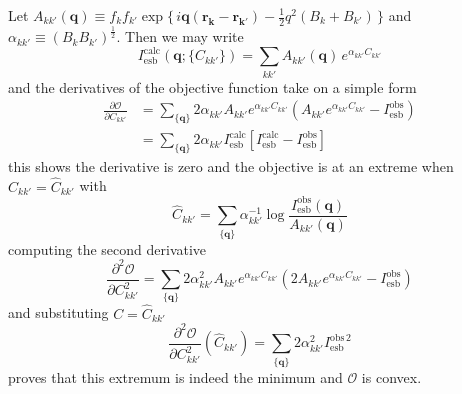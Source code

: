 \documentclass{article}
\begin{document}
Let $A_{k k'} (\mathbf{q}) \equiv f_{k}f_{k'} \exp \{ \, i \mathbf{q} (\mathbf{r_{k}}- \mathbf{r_{k'}}) - \frac{1}{2} q^2(B_k + B_{k'} ) \, \}$ and $\alpha_{k k'} \equiv (B_k B_{k'})^\frac{1}{2}$. Then we may write
\[
I_\mathrm{esb}^\mathrm{calc} (\mathbf{q}; \{ C_{kk'} \}) = \sum_{k k'} A_{k k'} (\mathbf{q}) \, e^{\alpha_{k k'} C_{k k'}}
\]
and the derivatives of the objective function take on a simple form
\begin{align*}
\frac{\partial \mathcal{O}} {\partial C_{kk'}} &= \sum_{\{\mathbf{q}\}}
2 \alpha_{k k'} A_{k k'} e^{\alpha_{k k'} C_{k k'}} 
\left( A_{k k'} e^{\alpha_{k k'} C_{k k'}} - I_\mathrm{esb}^\mathrm{obs}  \right) \\
%
&= \sum_{\{\mathbf{q}\}} 2 \alpha_{k k'} I_\mathrm{esb}^\mathrm{calc} \left[
I_\mathrm{esb}^\mathrm{calc} - I_\mathrm{esb}^\mathrm{obs}
\right]
\end{align*}
this shows the derivative is zero and the objective is at an extreme when $C_{kk'} = \hat{C}_{kk'}$ with
\[
\hat{C}_{kk'} = \sum_{\{\mathbf{q}\}} \alpha_{kk'}^{-1} 
\log \frac{I_\mathrm{esb}^\mathrm{obs} (\mathbf{q}) }{A_{kk'} (\mathbf{q}) }
\]
computing the second derivative
\[
\frac{\partial^2 \mathcal{O}} {\partial C_{kk'}^2} = \sum_{\{\mathbf{q}\}}
2 \alpha_{k k'}^2 A_{k k'} e^{\alpha_{k k'} C_{k k'}} 
\left( 2 A_{k k'} e^{\alpha_{k k'} C_{k k'}} - I_\mathrm{esb}^\mathrm{obs} \right)
\]
and substituting $C = \hat{C}_{kk'}$
\[
\frac{\partial^2 \mathcal{O}} {\partial C_{kk'}^2} (\hat{C}_{kk'}) = \sum_{\{\mathbf{q}\}} 2 \alpha_{k k'}^2 I_\mathrm{esb}^{\mathrm{obs}\, 2}
\]
proves that this extremum is indeed the minimum and $\mathcal{O}$ is convex.
\end{document}

